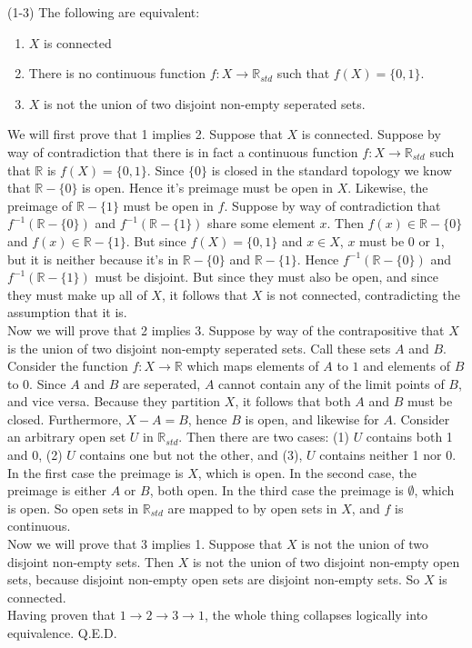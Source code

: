 \documentclass{article}
\newcommand{\R}{\mathbb{R}}
\newcommand{\R}{\mathbb{R}}
\begin{document}
 (1-3) The following are equivalent:
\begin{enumerate}
    \item $X$ is connected
    \item There is no continuous function $f:X\rightarrow \R_{std}$ such that $f(X) = \{0,1\}$.
    \item $X$ is not the union of two disjoint non-empty seperated sets.
\end{enumerate}
We will first prove that 1 implies 2. Suppose that $X$ is connected. Suppose by way of contradiction that there is in fact a continuous function $f:X\rightarrow \R_{std}$ such that $\R$ is $f(X) = \{0,1\}$. Since $\{0\}$ is closed in the standard topology we know that $\R-\{0\}$ is open. Hence it's preimage must be open in $X$. Likewise, the preimage of $\R-\{1\}$ must be open in  $f$. Suppose by way of contradiction that $f^{-1}(\R-\{0\})$ and $f^{-1}(\R-\{1\})$ share some element $x$. Then $f(x) \in \R-\{0\}$ and $f(x)\in \R-\{1\}$. But since $f(X) = \{0,1\}$ and $x\in X$, $x$ must be $0$ or $1$, but it is neither because it's in $\R-\{0\}$ and $\R-\{1\}$. Hence $f^{-1}(\R-\{0\})$ and $f^{-1}(\R-\{1\})$ must be disjoint. But since they must also be open, and since they must make up all of $X$, it follows that $X$ is not connected, contradicting the assumption that it is. \\

Now we will prove that 2 implies 3. Suppose by way of the contrapositive that $X$ is the union of two disjoint non-empty seperated sets. Call these sets $A$ and $B$. Consider the function $f:X\rightarrow \R$ which maps elements of $A$ to $1$ and elements of $B$ to $0$. Since $A$ and $B$ are seperated, $A$ cannot contain any of the limit points of $B$, and vice versa. Because they partition $X$, it follows that both $A$ and $B$ must be closed. Furthermore, $X-A= B$, hence $B$ is open, and likewise for $A$. Consider an arbitrary open set $U$ in $\R_{std}$. Then there are two cases: (1) $U$ contains both 1 and 0, (2) $U$ contains one but not the other, and (3), $U$ contains neither 1 nor 0. In the first case the preimage is $X$, which is open. In the second case, the preimage is either $A$ or $B$, both open. In the third case the preimage is $\emptyset$, which is open. So open sets in $\R_{std}$ are mapped to by open sets in $X$, and $f$ is continuous.\\

Now we will prove that 3 implies 1. Suppose that $X$ is not the union of two disjoint non-empty sets. Then $X$ is not the union of two disjoint non-empty open sets, because disjoint non-empty open sets are disjoint non-empty sets. So $X$ is connected.\\

Having proven that $1\rightarrow 2\rightarrow 3\rightarrow 1$, the whole thing collapses logically into equivalence.
Q.E.D.
\end{document}
